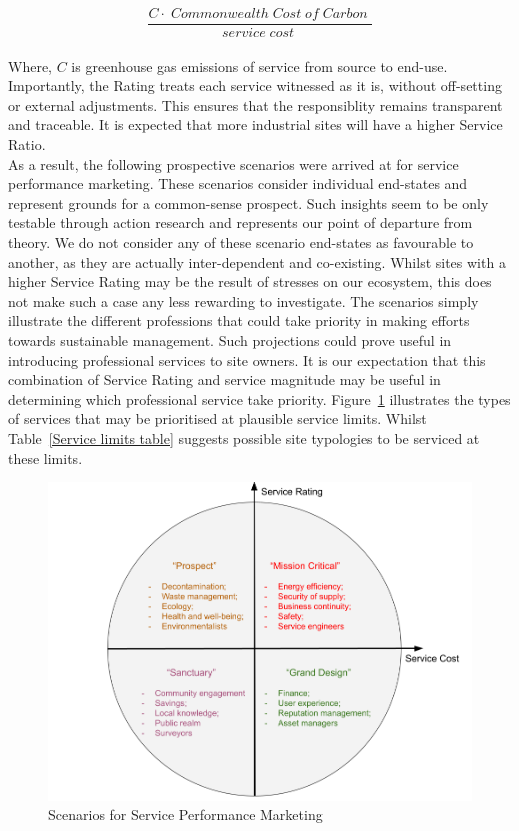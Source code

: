 \documentclass[12pt, oneside]{article}   	%
\begin{document}
\begin{equation}
	\frac{C  \cdot \;Commonwealth\; Cost\; of\; Carbon\;}{service\; cost\;}
\end{equation}\\

Where, $C$ is greenhouse gas emissions of service from source to end-use.
Importantly, the Rating treats each service witnessed as it is, without off-setting or external adjustments.
This ensures that the responsiblity remains transparent and traceable.
It is expected that more industrial sites will have a higher Service Ratio.\\

As a result, the following prospective scenarios were arrived at for service performance marketing.
These scenarios consider individual end-states and represent grounds for a common-sense prospect.
Such insights seem to be only testable through action research and represents our point of departure from theory.
We do not consider any of these scenario end-states as favourable to another, as they are actually inter-dependent and co-existing.
Whilst sites with a higher Service Rating may be the result of stresses on our ecosystem, this does not make such a case any less rewarding to investigate.
The scenarios simply illustrate the different professions that could take priority in making efforts towards sustainable management.
Such projections could prove useful in introducing professional services to site owners.
It is our expectation that this combination of Service Rating and service magnitude may be useful in determining which professional service take priority.
Figure~\ref{Scenarios} illustrates the types of services that may be prioritised at plausible service limits.
Whilst Table~\ref{Service limits table} suggests possible site typologies to be serviced at these limits.\\

\begin{figure}[H]
\centering
\includegraphics[width=1\textwidth]{scenarios}
\caption{Scenarios for Service Performance Marketing}
\label{Scenarios}
\end{figure}
\end{document}
